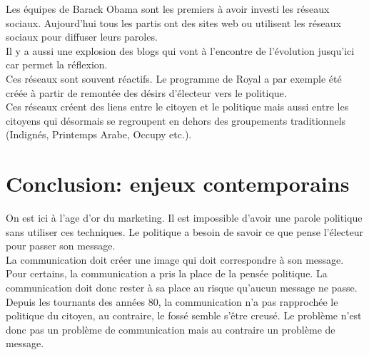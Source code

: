 \documentclass[12pt, a4paper, openany]{book}
\begin{document}
Les équipes de Barack Obama sont les premiers à avoir investi les réseaux sociaux. Aujourd'hui tous les partis ont des sites web ou utilisent les réseaux sociaux pour diffuser leurs paroles. \\
Il y a aussi une explosion des blogs qui vont à l'encontre de l'évolution jusqu'ici car permet la réflexion. \\
Ces réseaux sont souvent réactifs. Le programme de Royal a par exemple été créée à partir de remontée des désirs d'électeur vers le politique. \\
Ces réseaux créent des liens entre le citoyen et le politique mais aussi entre les citoyens qui désormais se regroupent en dehors des groupements traditionnels (Indignés, Printemps Arabe, Occupy etc.).

\section{Conclusion: enjeux contemporains}

On est ici à l'age d'or du marketing. Il est impossible d'avoir une parole politique sans utiliser ces techniques. Le politique a besoin de savoir ce que pense l'électeur pour passer son message. \\
La communication doit créer une image qui doit correspondre à son message. Pour certains, la communication a pris la place de la pensée politique. La communication doit donc rester à sa place au risque qu'aucun message ne passe. \\
Depuis les tournants des années 80, la communication n'a pas rapprochée le politique du citoyen, au contraire, le fossé semble s'être creusé. Le problème n'est donc pas un problème de communication mais au contraire un problème de message. 
\end{document}
